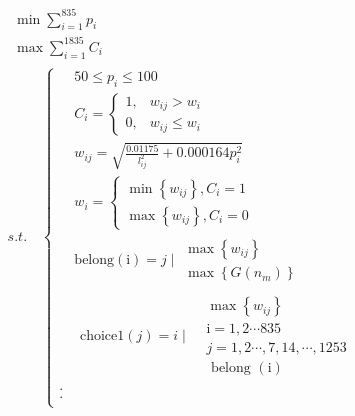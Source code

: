 $$\begin{aligned}
         & \begin{array}{l}
            \min \sum_{i=1}^{835} p_{i} \\
            \max \sum_{i=1}^{1835} C_{i}
        \end{array} \\
         & s.t.\quad
        \begin{cases}
             & 50 \leq p_{i} \leq 100                                        \\
             & C_{i}=\left\{\begin{array}{ll}
                1, & w_{i j}>w_{i}      \\
                0, & w_{i j} \leq w_{i}
            \end{array}\right.                \\
             & w_{i j}=\sqrt{\frac{0.01175}{l_{i j}^{2}}+0.000164 p_{i}^{2}} \\
             & w_{i}=\left\{\begin{array}{l}
                \min \left\{w_{i j}\right\}, C_{i}=1 \\
                \max \left\{w_{i j}\right\}, C_{i}=0
            \end{array}\right.                \\
             & \text {belong}(\mathrm{i})=j \mid \begin{array}{l}
                \max \left\{w_{i j}\right\} \\
                \max \left\{G\left(n_{m}\right)\right\}
            \end{array}  \\
             & \begin{array}{ll}
                \text {choice1}(j)=i \mid & \begin{array}{l}
                    \max \left\{w_{i j}\right\}      \\
                    \mathrm{i}=1,2 \cdots 835        \\
                    j=1,2 \cdots, 7,14, \cdots, 1253 \\
                    \text { belong }(\mathrm{i})
                \end{array}
            \end{array}                                    \\
            .                                                                \\
            .                                                                \\

\end{cases}
\end{aligned}$$
